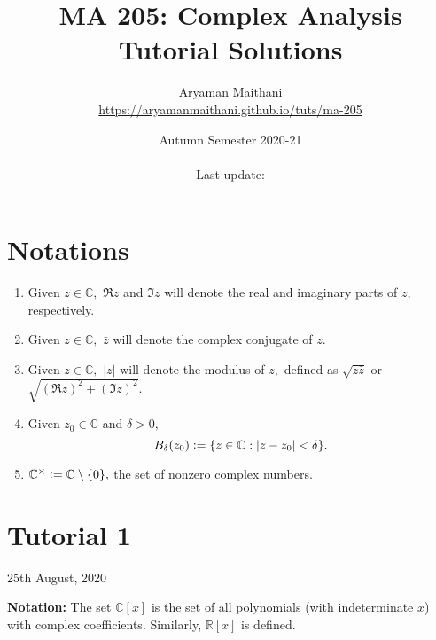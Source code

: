 \documentclass[12pt]{article}
\title{MA 205: Complex Analysis\\\large{Tutorial Solutions}}
\author{Aryaman Maithani\\\url{https://aryamanmaithani.github.io/tuts/ma-205}}
\date{Autumn Semester 2020-21\\~\\Last update: \DTMnow}
\theoremstyle{definition}
\begin{document}
\maketitle
\tableofcontents
\newpage
\setcounter{section}{-1}
\section{Notations}
\begin{enumerate}
	\item Given $z \in \mathbb{C},$ $\Re z$ and $\Im z$ will denote the real and imaginary parts of $z,$ respectively.
	\item Given $z \in \mathbb{C},$ $\bar{z}$ will denote the complex conjugate of $z.$
	\item Given $z \in \mathbb{C},$ $\left|z\right|$ will denote the modulus of $z,$ defined as $\sqrt{z\bar{z}}$ or $\sqrt{\left(\Re z\right)^2 + \left(\Im z\right)^2}.$
	\item Given $z_0 \in \mathbb{C}$ and $\delta > 0,$
	\begin{equation*} 
		B_\delta(z_0) \vcentcolon= \{z \in \mathbb{C} : |z - z_0| < \delta\}.
	\end{equation*}
	\item $\mathbb{C}^\times \vcentcolon= \mathbb{C}\setminus\{0\},$ the set of nonzero complex numbers.
\end{enumerate}
\newpage\section{Tutorial 1}
\begin{center}
	25th August, 2020
\end{center}
\textbf{Notation:} The set $\mathbb{C}[x]$ is the set of all polynomials (with indeterminate $x$) with complex coefficients. Similarly, $\mathbb{R}[x]$ is defined.
\end{document}
